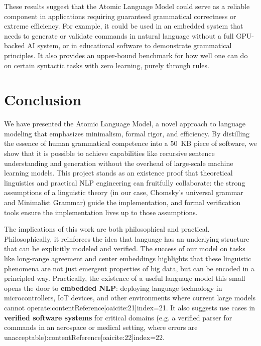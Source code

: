 \documentclass[11pt]{article}
\begin{document}
These results suggest that the Atomic Language Model could serve as a reliable component in applications requiring guaranteed grammatical correctness or extreme efficiency. For example, it could be used in an embedded system that needs to generate or validate commands in natural language without a full GPU-backed AI system, or in educational software to demonstrate grammatical principles. It also provides an upper-bound benchmark for how well one can do on certain syntactic tasks with zero learning, purely through rules.

\section{Conclusion}
We have presented the Atomic Language Model, a novel approach to language modeling that emphasizes minimalism, formal rigor, and efficiency. By distilling the essence of human grammatical competence into a 50~KB piece of software, we show that it is possible to achieve capabilities like recursive sentence understanding and generation without the overhead of large-scale machine learning models. This project stands as an existence proof that theoretical linguistics and practical NLP engineering can fruitfully collaborate: the strong assumptions of a linguistic theory (in our case, Chomsky's universal grammar and Minimalist Grammar) guide the implementation, and formal verification tools ensure the implementation lives up to those assumptions.

The implications of this work are both philosophical and practical. Philosophically, it reinforces the idea that language has an underlying structure that can be explicitly modeled and verified. The success of our model on tasks like long-range agreement and center embeddings highlights that these linguistic phenomena are not just emergent properties of big data, but can be encoded in a principled way. Practically, the existence of a useful language model this small opens the door to \textbf{embedded NLP}: deploying language technology in microcontrollers, IoT devices, and other environments where current large models cannot operate:contentReference[oaicite:21]{index=21}. It also suggests use cases in \textbf{verified software systems} for critical domains (e.g. a verified parser for commands in an aerospace or medical setting, where errors are unacceptable):contentReference[oaicite:22]{index=22}.
\end{document}
